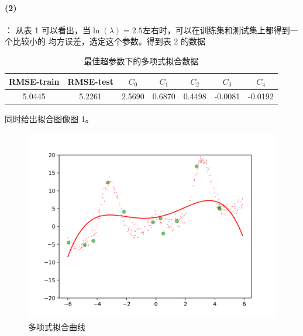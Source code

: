 \documentclass[a4paper,zihao=5,UTF8]{ctexart}
\begin{document}
    \paragraph{(2)}：
    从表 1 可以看出，当$\ln(\lambda) = 2.5$左右时，可以在训练集和测试集上都得到一个比较小的
    均方误差，选定这个参数。得到表 2 的数据
    \begin{table}[htbp]
        \centering
        \caption{最佳超参数下的多项式拟合数据}
        \begin{tabular}[htbp]{ccccccc}
            \toprule
            RMSE-train & RMSE-test & $C_0$ & $C_1$ & $C_2$ & $C_3$ & $C_4$\\
            \midrule
            5.0445 & 5.2261 & 2.5690 & 0.6870 & 0.4498 & -0.0081 & -0.0192 \\
            \bottomrule
        \end{tabular}
        \label{poly curve table}
    \end{table}
    同时给出拟合图像图 1。
    \begin{figure}[htbp]
        \centering
        \includegraphics[scale=0.8]{fit_curve_polynomials.png}
        \caption{多项式拟合曲线}
    \end{figure}
\end{document}
